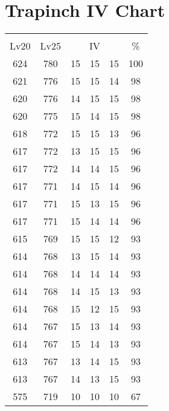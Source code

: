 \documentclass{article}%
\begin{document}
%
\normalsize%
\section{Trapinch IV Chart}%
\label{sec:Trapinch IV Chart}%
\renewcommand{\arraystretch}{1.5}%
\begin{tabular}{|c|c|c|c|c|c|}%
\hline%
\multicolumn{6}{|c|}{\textcolor{white}{ 
\linebreak{Trapinch}
}%
\cellcolor{black}}\\%
\multicolumn{1}{|c}{Lv20}&\multicolumn{1}{c|}{Lv25}&\multicolumn{3}{c|}{IV}&\multicolumn{1}{|c|}{\%}\\%
\hline%
\rowcolor{color100}%
624&780&15&15&15&100\\%
\hline%
\rowcolor{color98}%
621&776&15&15&14&98\\%
\hline%
\rowcolor{color98}%
620&776&14&15&15&98\\%
\hline%
\rowcolor{color98}%
620&775&15&14&15&98\\%
\hline%
\rowcolor{color96}%
618&772&15&15&13&96\\%
\hline%
\rowcolor{color96}%
617&772&13&15&15&96\\%
\hline%
\rowcolor{color96}%
617&772&14&14&15&96\\%
\hline%
\rowcolor{color96}%
617&771&14&15&14&96\\%
\hline%
\rowcolor{color96}%
617&771&15&13&15&96\\%
\hline%
\rowcolor{color96}%
617&771&15&14&14&96\\%
\hline%
\rowcolor{color93}%
615&769&15&15&12&93\\%
\hline%
\rowcolor{color93}%
614&768&13&15&14&93\\%
\hline%
\rowcolor{color93}%
614&768&14&14&14&93\\%
\hline%
\rowcolor{color93}%
614&768&14&15&13&93\\%
\hline%
\rowcolor{color93}%
614&768&15&12&15&93\\%
\hline%
\rowcolor{color93}%
614&767&15&13&14&93\\%
\hline%
\rowcolor{color93}%
614&767&15&14&13&93\\%
\hline%
\rowcolor{color93}%
613&767&13&14&15&93\\%
\hline%
\rowcolor{color93}%
613&767&14&13&15&93\\%
\hline%
\rowcolor{color91}%
575&719&10&10&10&67\\%
\end{tabular}

%
\end{document}
